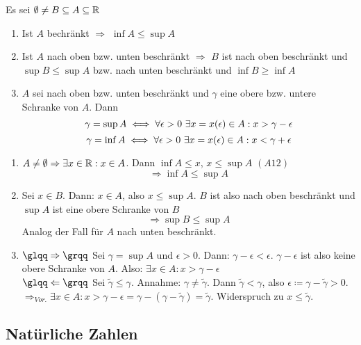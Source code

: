 \begin{satz} \label{satz-1.2}
	Es sei $\emptyset \neq B \subseteq A \subseteq \mathbb{R}$
	\begin{enumerate}
		\item Ist $A$ bechränkt $\Rightarrow$ $\inf A \leq \sup A$
		\item Ist $A$ nach oben bzw. unten beschränkt $\Rightarrow$ $B$ ist nach oben beschränkt und $\sup B \leq \sup A$ bzw. nach unten beschränkt und $\inf B \geq \inf A$
		\item $A$ sei nach oben bzw. unten beschränkt und $\gamma$ eine obere bzw. untere Schranke von $A$. Dann
			$$
				\gamma = \sup A \iff \forall \epsilon > 0 ~\exists x = x(\epsilon) \in A : x > \gamma - \epsilon
			$$
			$$
				\gamma = \inf A \iff \forall \epsilon > 0 ~\exists x = x(\epsilon) \in A : x < \gamma + \epsilon
			$$			
	\end{enumerate}
\end{satz}

\begin{beweis}
	\begin{enumerate}
		\item $A \neq \emptyset \Rightarrow \exists x \in \mathbb{R} : x \in A$. Dann $\inf A \leq x$, $x \leq \sup A$ $(A12)$
			$$ \Rightarrow \inf A \leq \sup A $$
		\item Sei $x \in B$. Dann: $x \in A$, also $x \leq \sup A$. $B$ ist also nach oben beschränkt und $\sup A$ ist eine obere Schranke von $B$
			$$ \Rightarrow \sup B \leq \sup A $$
			Analog der Fall für $A$ nach unten beschränkt.
		\item $\glqq \Rightarrow \grqq$ Sei $\gamma = \sup A$ und $\epsilon > 0$. Dann: $\gamma - \epsilon < \epsilon$. $\gamma - \epsilon$ ist also keine obere Schranke von $A$. Also: $\exists x \in A : x > \gamma - \epsilon$ \\
			$\glqq \Leftarrow \grqq$ Sei $\tilde{\gamma} \leq \gamma$. Annahme: $\gamma \neq \tilde{\gamma}$. Dann $\tilde{\gamma} < \gamma$, also $\epsilon \coloneqq \gamma - \tilde{\gamma} > 0$. \\
			$\Rightarrow_{Vor.} \exists x \in A: x > \gamma - \epsilon = \gamma - (\gamma - \tilde{\gamma}) = \tilde{\gamma}$. Widerspruch zu $x \leq \tilde{\gamma}$.
	\end{enumerate}
\end{beweis}


\subsection*{Natürliche Zahlen} 


